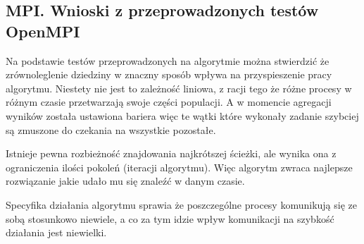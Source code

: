 \documentclass[10pt,a4paper]{article}
\begin{document}
\subsection{MPI. Wnioski z przeprowadzonych testów OpenMPI}

Na podstawie testów przeprowadzonych na algorytmie można stwierdzić że zrównoleglenie dziedziny w znaczny sposób wpływa na przyspieszenie pracy algorytmu.
Niestety nie jest to zależność liniowa, z racji tego że różne procesy w różnym czasie przetwarzają swoje części populacji. A w momencie agregacji wyników została ustawiona bariera więc te wątki które wykonały zadanie szybciej są zmuszone do czekania na wszystkie pozostałe.

Istnieje pewna rozbieżność znajdowania najkrótszej ścieżki, ale wynika ona z ograniczenia ilości pokoleń (iteracji algorytmu). Więc algorytm zwraca najlepsze rozwiązanie jakie udało mu się znaleźć w danym czasie.

 Specyfika działania algorytmu sprawia że poszczególne procesy komunikują się ze sobą stosunkowo niewiele, a co za tym idzie wpływ komunikacji na szybkość działania jest niewielki.
 
\end{document}
